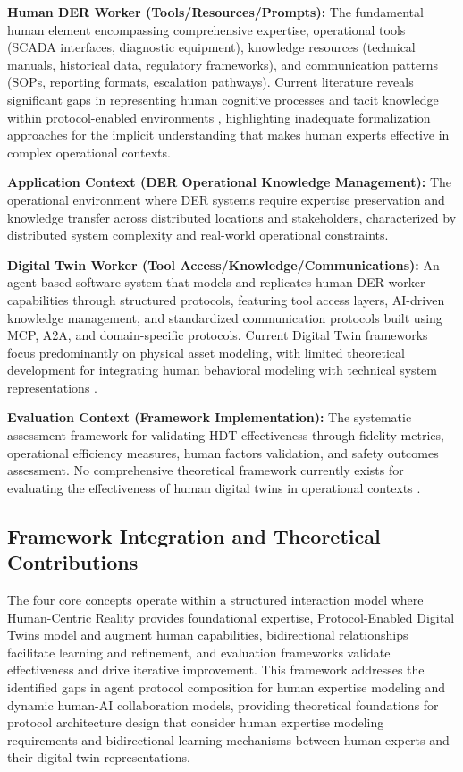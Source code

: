 \documentclass[12pt,a4paper]{article}
\begin{document}
\textbf{Human DER Worker (Tools/Resources/Prompts):} The fundamental human element encompassing comprehensive expertise, operational tools (SCADA interfaces, diagnostic equipment), knowledge resources (technical manuals, historical data, regulatory frameworks), and communication patterns (SOPs, reporting formats, escalation pathways). Current literature reveals significant gaps in representing human cognitive processes and tacit knowledge within protocol-enabled environments \cite{10.1007/s44163-022-00020-w} \cite{10.1016/j.apergo.2018.07.016}, highlighting inadequate formalization approaches for the implicit understanding that makes human experts effective in complex operational contexts.

\textbf{Application Context (DER Operational Knowledge Management):} The operational environment where DER systems require expertise preservation and knowledge transfer across distributed locations and stakeholders, characterized by distributed system complexity and real-world operational constraints.

\textbf{Digital Twin Worker (Tool Access/Knowledge/Communications):} An agent-based software system that models and replicates human DER worker capabilities through structured protocols, featuring tool access layers, AI-driven knowledge management, and standardized communication protocols built using MCP, A2A, and domain-specific protocols. Current Digital Twin frameworks focus predominantly on physical asset modeling, with limited theoretical development for integrating human behavioral modeling with technical system representations \cite{10.1016/j.esr.2024.101334} \cite{10.1007/s10207-023-00784-x}.

\textbf{Evaluation Context (Framework Implementation):} The systematic assessment framework for validating HDT effectiveness through fidelity metrics, operational efficiency measures, human factors validation, and safety outcomes assessment. No comprehensive theoretical framework currently exists for evaluating the effectiveness of human digital twins in operational contexts \cite{10.1109/etfa61755.2024.10711109} \cite{10.1016/j.ifacol.2022.09.675}.

\subsection{Framework Integration and Theoretical Contributions}

The four core concepts operate within a structured interaction model where Human-Centric Reality provides foundational expertise, Protocol-Enabled Digital Twins model and augment human capabilities, bidirectional relationships facilitate learning and refinement, and evaluation frameworks validate effectiveness and drive iterative improvement. This framework addresses the identified gaps in agent protocol composition for human expertise modeling and dynamic human-AI collaboration models, providing theoretical foundations for protocol architecture design that consider human expertise modeling requirements and bidirectional learning mechanisms between human experts and their digital twin representations.
\end{document}
